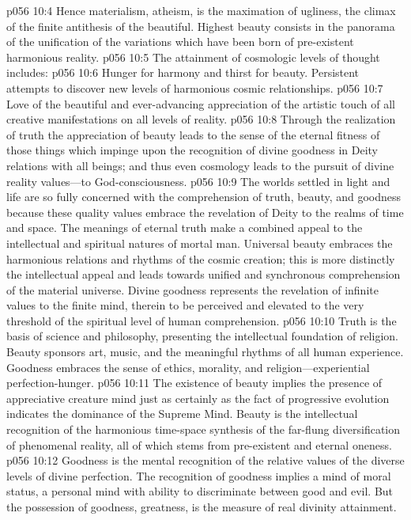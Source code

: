 \vs p056 10:4 Hence materialism, atheism, is the maximation of ugliness, the climax of the finite antithesis of the beautiful. Highest beauty consists in the panorama of the unification of the variations which have been born of pre\hyp{}existent harmonious reality.
\vs p056 10:5 The attainment of cosmologic levels of thought includes:
\pc \vs p056 10:6 \bibnobreakspace {} Hunger for harmony and thirst for beauty. Persistent attempts to discover new levels of harmonious cosmic relationships.
\pc \vs p056 10:7 \bibnobreakspace {} Love of the beautiful and ever\hyp{}advancing appreciation of the artistic touch of all creative manifestations on all levels of reality.
\pc \vs p056 10:8 \bibnobreakspace {} Through the realization of truth the appreciation of beauty leads to the sense of the eternal fitness of those things which impinge upon the recognition of divine goodness in Deity relations with all beings; and thus even cosmology leads to the pursuit of divine reality values---to God\hyp{}consciousness.\plusone
\pc \vs p056 10:9 The worlds settled in light and life are so fully concerned with the comprehension of truth, beauty, and goodness because these quality values embrace the revelation of Deity to the realms of time and space. The meanings of eternal truth make a combined appeal to the intellectual and spiritual natures of mortal man. Universal beauty embraces the harmonious relations and rhythms of the cosmic creation; this is more distinctly the intellectual appeal and leads towards unified and synchronous comprehension of the material universe. Divine goodness represents the revelation of infinite values to the finite mind, therein to be perceived and elevated to the very threshold of the spiritual level of human comprehension.
\vs p056 10:10 Truth is the basis of science and philosophy, presenting the intellectual foundation of religion. Beauty sponsors art, music, and the meaningful rhythms of all human experience. Goodness embraces the sense of ethics, morality, and religion---experiential perfection\hyp{}hunger.
\vs p056 10:11 The existence of beauty implies the presence of appreciative creature mind just as certainly as the fact of progressive evolution indicates the dominance of the Supreme Mind. Beauty is the intellectual recognition of the harmonious time\hyp{}space synthesis of the far\hyp{}flung diversification of phenomenal reality, all of which stems from pre\hyp{}existent and eternal oneness.
\vs p056 10:12 Goodness is the mental recognition of the relative values of the diverse levels of divine perfection. The recognition of goodness implies a mind of moral status, a personal mind with ability to discriminate between good and evil. But the possession of goodness, greatness, is the measure of real divinity attainment.

